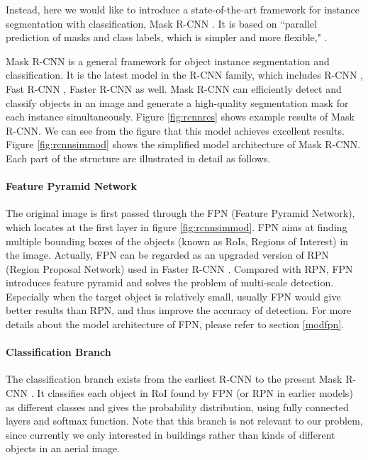 Instead, here we would like to introduce a state-of-the-art framework for instance segmentation with classification, Mask R-CNN \cite{maskrcnn}. It is based on ``parallel prediction of masks and class labels, which is simpler and more flexible," \cite{maskrcnn}.

Mask R-CNN is a general framework for object instance segmentation and classification. It is the latest model in the R-CNN family, which includes R-CNN \cite{rcnn}, Fast R-CNN \cite{fastrcnn}, Faster R-CNN \cite{fasterrcnn} as well. Mask R-CNN can efficiently detect and classify objects in an image and generate a high-quality segmentation mask for each instance simultaneously. Figure \ref{fig:rcnnres} shows example results of Mask R-CNN. We can see from the figure that this model achieves excellent results. Figure \ref{fig:rcnnsimmod} shows the simplified model architecture of Mask R-CNN. Each part of the structure are illustrated in detail as follows.




\paragraph{Feature Pyramid Network} The original image is first passed through the FPN (Feature Pyramid Network), which locates at the first layer in figure \ref{fig:rcnnsimmod}. FPN aims at finding multiple bounding boxes of the objects (known as RoIs, Regions of Interest) in the image. Actually, FPN can be regarded as an upgraded version of RPN (Region Proposal Network) used in Faster R-CNN \cite{fasterrcnn}. Compared with RPN, FPN introduces feature pyramid and solves the problem of multi-scale detection. Especially when the target object is relatively small, usually FPN would give better results than RPN, and thus improve the accuracy of detection. For more details about the model architecture of FPN, please refer to section \ref{modfpn}.

\paragraph{Classification Branch}
The classification branch exists from the earliest R-CNN \cite{rcnn} to the present Mask R-CNN \cite{maskrcnn}. It classifies each object in RoI found by FPN (or RPN in earlier models) as different classes and gives the probability distribution, using fully connected layers and softmax function. Note that this branch is not relevant to our problem, since currently we only interested in buildings rather than kinds of different objects in an aerial image.

